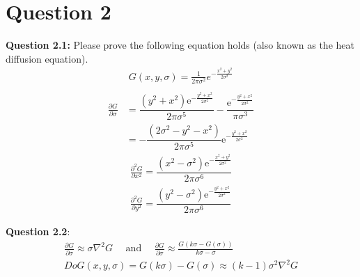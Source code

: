 \documentclass[12pt]{article}
\begin{document}
\section*{Question 2}

\textbf{Question 2.1:} Please prove the following equation holds (also known as the heat diffusion equation). 
\begin{gather*}
    G(x,y,\sigma) = \frac{1}{2 \pi \sigma^2} e^{-\frac{x^2 + y^2}{2\sigma^2}} \\ 
\end{gather*}
\begin{align*}
    \frac{\partial G}{\partial \sigma} &= \dfrac{\left(y^2+x^2\right)\mathrm{e}^{-\frac{y^2+x^2}{2{\sigma}^2}}}{2{\pi}{\sigma}^5}-\dfrac{\mathrm{e}^{-\frac{y^2+x^2}{2{\sigma}^2}}}{{\pi}{\sigma}^3} \\
    &= -\dfrac{\left(2{\sigma}^2-y^2-x^2\right)}{2{\pi}{\sigma}^5}\mathrm{e}^{-\frac{y^2+x^2}{2{\sigma}^2}}
\end{align*}
\begin{gather*}
    \frac{\partial^2 G}{\partial x^2} = \dfrac{\left(x^2-{\sigma}^2\right)\mathrm{e}^{-\frac{x^2+y^2}{2{\sigma}^2}}}{2{\pi}{\sigma}^6} \\ 
    \frac{\partial^2 G}{\partial y^2} = \dfrac{\left(y^2-{\sigma}^2\right)\mathrm{e}^{-\frac{y^2+x^2}{2{\sigma}^2}}}{2{\pi}{\sigma}^6}
\end{gather*}

\textbf{Question 2.2}: 
\begin{gather*}
    \frac{\partial G}{\partial\sigma} \approx \sigma \nabla^2 G \quad \text{ and } \quad \frac{\partial G}{\partial\sigma} \approx \frac{G(k\sigma - G(\sigma))}{k\sigma - \sigma}\\ 
    DoG(x,y,\sigma) = G(k\sigma) - G(\sigma) \approx (k-1)\sigma^2 \nabla^2 G
\end{gather*}
\end{document}
